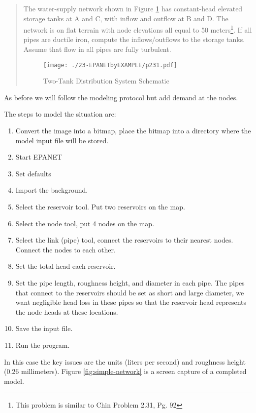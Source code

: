\begin{quote}
The water-supply network shown in Figure \ref{fig:p231} has constant-head elevated storage tanks at A and C, with inflow and outflow at B and D.  The network is on flat terrain with node elevations all equal to 50 meters\footnote{This problem is similar to Chin Problem 2.31, Pg. 92}.  If all pipes are ductile iron, compute the inflows/outflows to the storage tanks.   Assume that flow in all pipes are fully turbulent.

\begin{figure}[htbp] %
   \centering
   \texttt{[image: ./23-EPANETbyEXAMPLE/p231.pdf]} 
   \caption{Two-Tank Distribution System Schematic}
   \label{fig:p231}
\end{figure}
\end{quote}

As before we will follow the modeling protocol but add demand at the nodes.

The steps to model the situation are:
\begin{enumerate}
\item Convert the image into a bitmap, place the bitmap into a directory where the model input file will be stored.
\item Start EPANET
\item Set defaults
\item Import the background.
\item Select the reservoir tool.  Put two reservoirs on the map.
\item Select the node tool, put 4 nodes on the map.
\item Select the link (pipe) tool, connect the reservoirs to their nearest nodes.  Connect the nodes to each other.  
\item Set the total head each reservoir.
\item Set the pipe length, roughness height, and diameter in each pipe.  The pipes that connect to the reservoirs should be set as short and large diameter, we want negligible head loss in these pipes so that the reservoir head represents the node heads at these locations.
\item Save the input file.
\item Run the program.   
\end{enumerate}

In this case the key issues are the units (liters per second) and roughness height (0.26 millimeters).   Figure \ref{fig:simple-network} is a screen capture of a completed model.   


